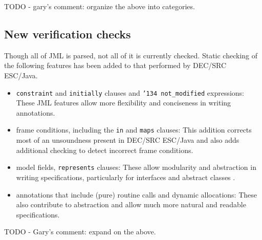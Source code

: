 \documentclass{sig-alternate}
\begin{document}
TODO - gary's comment: organize the above into categories.

\subsection{New verification checks}
Though all of JML is parsed, not all of it is currently checked.
Static checking of the following features has been added to that performed by
DEC/SRC ESC/Java.
\setlength{\partopsep}{0in}\setlength{\parskip}{0in}\setlength{\itemsep}{0in}\setlength{\topsep}{0in}
\begin{itemize}
\setlength{\partopsep}{0in}\setlength{\parskip}{0in}\setlength{\itemsep}{0in}\setlength{\topsep}{0in}
\item \texttt{constraint} and \texttt{initially} clauses and \texttt{\char'134 not\_modified} expressions: These JML features allow more flexibility and conciseness in writing annotations.
\item frame conditions, including the \texttt{in} and \texttt{maps} clauses:  This addition corrects
most of an unsoundness present in DEC/SRC ESC/Java and also adds additional checking to detect
incorrect frame conditions.
\item model fields, \texttt{represents} clauses: These allow modularity and abstraction in
writing specifications, particularly for interfaces and abstract classes \cite{Cheon-etal03}.
\item annotations that include (pure) routine calls and dynamic allocations: These also contribute
to abstraction and allow much more natural and readable specifications.
\end{itemize}

TODO - Gary's comment: expand on the above.
\end{document}
